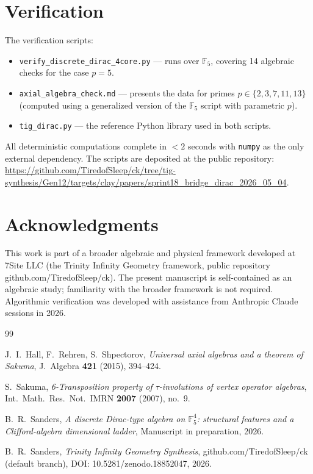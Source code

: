 \documentclass[11pt,reqno]{amsart}
\theoremstyle{plain}
\theoremstyle{definition}
\theoremstyle{remark}
\newcommand{\F}{\mathbb{F}}
\begin{document}
\section{Verification}
\label{sec:verify}

The verification scripts:
\begin{itemize}
\item \texttt{verify\_discrete\_dirac\_4core.py} --- runs over $\F_5$,
covering 14 algebraic checks for the case $p=5$.
\item \texttt{axial\_algebra\_check.md} --- presents the data for primes
$p \in \{2, 3, 7, 11, 13\}$ (computed using a generalized version of the
$\F_5$ script with parametric $p$).
\item \texttt{tig\_dirac.py} --- the reference Python library used in
both scripts.
\end{itemize}

All deterministic computations complete in $<2$ seconds with
\texttt{numpy} as the only external dependency.  The scripts are
deposited at the public repository:
\url{https://github.com/TiredofSleep/ck/tree/tig-synthesis/Gen12/targets/clay/papers/sprint18_bridge_dirac_2026_05_04}.

\section*{Acknowledgments}

This work is part of a broader algebraic and physical framework developed
at 7Site LLC (the Trinity Infinity Geometry framework, public repository
github.com/TiredofSleep/ck). The present manuscript is self-contained as
an algebraic study; familiarity with the broader framework is not
required. Algorithmic verification was developed with assistance from
Anthropic Claude sessions in 2026.

\begin{thebibliography}{99}

 J.~I.~Hall, F.~Rehren, S.~Shpectorov,
\emph{Universal axial algebras and a theorem of Sakuma},
J.~Algebra \textbf{421} (2015), 394--424.

 S.~Sakuma,
\emph{6-Transposition property of $\tau$-involutions of vertex operator algebras},
Int.~Math.~Res.~Not.~IMRN \textbf{2007} (2007), no.~9.

 B.~R.~Sanders,
\emph{A discrete Dirac-type algebra on $\F_5^4$: structural features
and a Clifford-algebra dimensional ladder},
Manuscript in preparation, 2026.

 B.~R.~Sanders,
\emph{Trinity Infinity Geometry Synthesis},
github.com/TiredofSleep/ck (default branch),
DOI: 10.5281/zenodo.18852047, 2026.

\end{thebibliography}
\end{document}
